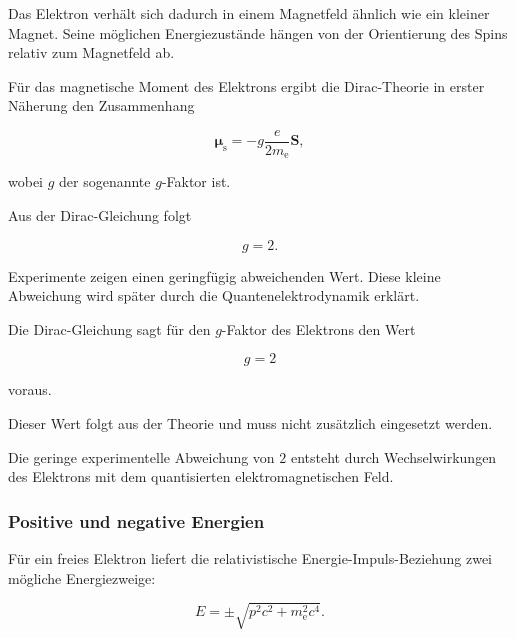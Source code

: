 Das Elektron verhält sich dadurch in einem Magnetfeld ähnlich wie ein
kleiner Magnet. Seine möglichen Energiezustände hängen von der
Orientierung des Spins relativ zum Magnetfeld ab.

Für das magnetische Moment des Elektrons ergibt die Dirac-Theorie in
erster Näherung den Zusammenhang

\begin{equation}
	\boldsymbol{\mu}_{\mathrm s}
	=
	-g
	\frac{e}{2m_{\mathrm e}}
	\mathbf{S},
	\label{eq:magnetisches_moment_dirac}
\end{equation}

wobei \(g\) der sogenannte \(g\)-Faktor%
 ist.

Aus der Dirac-Gleichung folgt

\begin{equation}
	g
	=
	2.
	\label{eq:g_faktor_dirac}
\end{equation}

Experimente zeigen einen geringfügig abweichenden Wert. Diese kleine
Abweichung wird später durch die Quantenelektrodynamik erklärt.

\begin{DidacticBox}
	\label{box:g_faktor_erfolg_dirac}
	
	Die Dirac-Gleichung sagt für den \(g\)-Faktor des Elektrons den Wert
	
	\begin{equation}
		g=2
	\end{equation}
	
	voraus.
	
	Dieser Wert folgt aus der Theorie und muss nicht zusätzlich eingesetzt
	werden.
	
	Die geringe experimentelle Abweichung von \(2\) entsteht durch
	Wechselwirkungen des Elektrons mit dem quantisierten
	elektromagnetischen Feld.
\end{DidacticBox}

\subsubsection*{Positive und negative Energien}

Für ein freies Elektron liefert die relativistische
Energie-Impuls-Beziehung zwei mögliche Energiezweige:

\begin{equation}
	E
	=
	\pm
	\sqrt{
		p^2c^2
		+
		m_{\mathrm e}^2c^4
	}.
	\label{eq:positive_negative_energie_dirac}
\end{equation}

